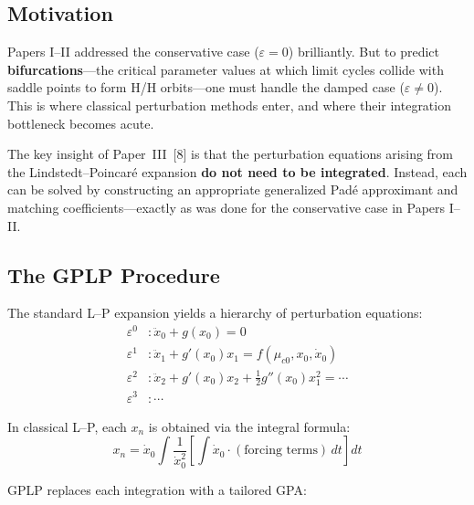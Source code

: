 \documentclass[11pt,a4paper]{article}
\begin{document}
\subsection{Motivation}

Papers I--II addressed the conservative case ($\varepsilon = 0$) brilliantly. But to predict \textbf{bifurcations}---the critical parameter values at which limit cycles collide with saddle points to form H/H orbits---one must handle the damped case ($\varepsilon \neq 0$). This is where classical perturbation methods enter, and where their integration bottleneck becomes acute.

The key insight of Paper~III~[8] is that the perturbation equations arising from the Lindstedt--Poincar\'e expansion \textbf{do not need to be integrated}. Instead, each can be solved by constructing an appropriate generalized Pad\'e approximant and matching coefficients---exactly as was done for the conservative case in Papers I--II.

\subsection{The GPLP Procedure}

The standard L--P expansion yields a hierarchy of perturbation equations:
\begin{align}
\varepsilon^0&: \ddot{x}_0 + g(x_0) = 0 \label{eq:lp0}\\
\varepsilon^1&: \ddot{x}_1 + g'(x_0)x_1 = f(\mu_{c0}, x_0, \dot{x}_0) \label{eq:lp1}\\
\varepsilon^2&: \ddot{x}_2 + g'(x_0)x_2 + \tfrac{1}{2}g''(x_0)x_1^2 = \cdots \label{eq:lp2}\\
\varepsilon^3&: \cdots \nonumber
\end{align}

In classical L--P, each $x_n$ is obtained via the integral formula:
\begin{equation}
x_n = \dot{x}_0 \int \frac{1}{\dot{x}_0^2} \left[ \int \dot{x}_0 \cdot (\text{forcing terms})\, dt \right] dt
\label{eq:integral_formula}
\end{equation}

GPLP replaces each integration with a tailored GPA:
\end{document}

